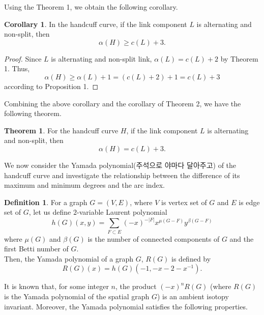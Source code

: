 \documentclass{article}
\theoremstyle{definition}
\newtheorem{defn}[thm]{Definition}
\theoremstyle{theorem}
\newtheorem{theorem}{Theorem}
\theoremstyle{proposition}
\theoremstyle{corollary}
\newtheorem*{corol}{Corollary}
\begin{document}
Using the Theorem 1, we obtain the following corollary.

\begin{corol}
    In the handcuff curve, if the link component $L$ is alternating and non-split, then
    \[ \alpha(H) \geq c(L)+3. \]
\end{corol}

\begin{proof}
    Since $L$ is alternating and non-split link, $\alpha(L)=c(L)+2$ by Theorem 1. Thus, \[\alpha(H) \geq \alpha(L)+1 = \left( c(L)+2 \right)+1 = c(L)+3\] according to Proposition 1.
\end{proof}

Combining the above corollary and the corollary of Theorem 2, we have the following theorem.

\begin{theorem}
    For the handcuff curve $H$, if the link component $L$ is alternating and non-split, then
    \[ \alpha(H) = c(L)+3. \]
\end{theorem}

We now consider the Yamada polynomial(주석으로 야마다 달아주고) of the handcuff curve and investigate the relationship between the difference of its maximum and minimum degrees and the arc index.

\begin{defn}
    For a graph $G=(V, E)$, where $V$ is vertex set of $G$ and $E$ is edge set of $G$, let us define $2$-variable Laurent polynomial
    \[ h(G)(x, y) = \sum_{F \subset E} (-x)^{-|F|} x^{\mu(G-F)} y^{\beta(G-F)} \]
    where $\mu(G)$ and $\beta(G)$ is the number of connected components of $G$ and the first Betti number of $G$. \\
    Then, the Yamada polynomial of a graph $G$, $R(G)$ is defined by
    \[ R(G)(x) = h(G)(-1, -x-2-x^{-1}). \]
\end{defn}

It is known that, for some integer $n$, the product $(-x)^n R(G)$ (where $R(G)$ is the Yamada polynomial of the spatial graph $G$) is an ambient isotopy invariant. Moreover, the Yamada polynomial satisfies the following properties.
\end{document}
